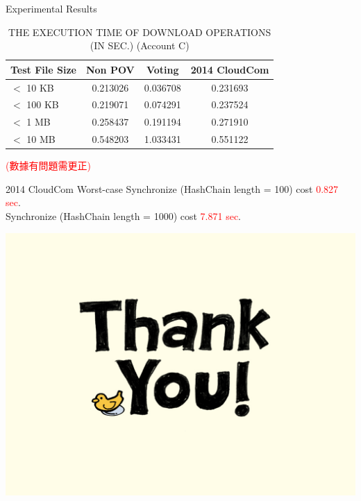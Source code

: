 \documentclass{beamer}
\newcommand{\tab}[1]{\hspace{.1\textwidth}\rlap{#1}}
\begin{document}
\begin{CJK}{UTF8}{bkai}
\begin{frame}{Experimental Results}
	\scriptsize	
	\begin{table}[]
    	\large
		\centering      
		\caption{THE EXECUTION TIME OF \alert{DOWNLOAD} OPERATIONS (IN SEC.) (Account C)}
		\begin{tabular}{lccc}      	
            Test File Size & Non POV  & Voting   & 2014 CloudCom \\ \hline
            $<$ 10 KB      & 0.213026 & 0.036708 & 0.231693      \\ \hline
            $<$ 100 KB     & 0.219071 & 0.074291 & 0.237524      \\ \hline
            $<$ 1 MB       & 0.258437 & 0.191194 & 0.271910      \\ \hline
            $<$ 10 MB      & 0.548203 & 1.033431 & 0.551122      \\
		\end{tabular}
	\end{table}
    \tab{} \textcolor{red}{(數據有問題需更正)}
    \begin{alertblock}{2014 CloudCom Worst-case}
    	\normalsize
    	\tab{} Synchronize (HashChain length = 100) cost \textcolor{red}{0.827 sec}. \\
        \tab{} Synchronize (HashChain length = 1000) cost \textcolor{red}{7.871 sec}.
    \end{alertblock}
\end{frame}

\begin{frame}
	\begin{center}
		\includegraphics[width=\textwidth]{thank_you.jpg}
	\end{center}	
\end{frame}

\end{CJK}
\end{document}

